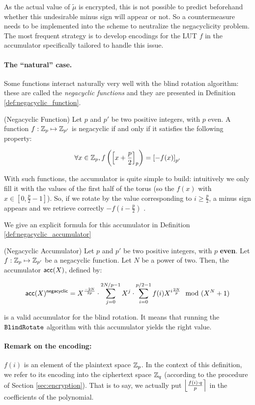 As the actual value of $\tilde{\mu}$ is encrypted, this is not possible to predict beforehand whether this undesirable minus sign will appear or not. So a countermeasure needs to be implemented into the scheme to neutralize the negacyclicity problem. The most frequent strategy is to develop encodings for the LUT $f$ in the accumulator specifically tailored to handle this issue.


\paragraph{The ``natural'' case.}

Some functions interact naturally very well with the blind rotation algorithm: these are called the \textit{negacyclic functions} and they are presented in Definition \ref{def:negacyclic_function}.


\begin{definition} (Negacyclic Function)
	Let $p$ and $p'$ be two positive integers, with $p$ even. A function $f : \mathbb{Z}_p \mapsto \mathbb{Z}_{p'}$ is negacyclic if and only if it satisfies the following property:
	
	\[
		\forall x \in \mathbb{Z}_p, f\left (\left [ x + \frac p 2 \right ]_{p} \right ) = \left [ -f(x) \right ]_{p'}
	\]
	
	\label{def:negacyclic_function}
\end{definition}


With such functions, the accumulator is quite simple to build: intuitively we only fill it with the values of the first half of the torus (so the $f(x)$ with $x \in \left [0, \frac p 2 - 1 \right ]$). So, if we rotate by the value corresponding to $i \ge \frac p 2$, a minus sign appears and we retrieve correctly $-f\left(i - \frac p 2 \right)$ .

We give an explicit formula for this accumulator in Definition \ref{def:negacyclic_accumulator}

\begin{definition} (Negacyclic Accumulator)
		\label{def:negacyclic_accumulator}
		Let $p$ and $p'$ be two positive integers, with $p$ \textbf{even}. Let $f:\mathbb{Z}_p \mapsto \mathbb{Z}_{p'}$ be a negacyclic function. Let $N$ be a power of two. Then, the accumulator $\textsf{acc}(X)$, defined by:
	
	\[
		\textsf{acc}(X)^{\textsf{negacyclic}} = X^{\frac{-2N}{2p}} \cdot \sum_{j=0}^{2N / p - 1} X^j \cdot \sum_{i=0}^{p/2 - 1} f(i) X^{i \frac{2N}{p}} \mod (X^N + 1)
	\]
	
\noindent is a valid accumulator for the blind rotation. It means that running the $\texttt{BlindRotate}$ algorithm with this accumulator yields the right value.
	
	\paragraph{Remark on the encoding:}
	$f(i)$ is an element of the plaintext space $\mathbb{Z}_p$. In the context of this definition, we refer to its encoding into the ciphertext space $\mathbb{Z}_q$ (according to the procedure of Section \ref{sec:encryption}). That is to say, we actually put $\left \lfloor \frac{f(i) \cdot q}{p} \right \rceil$ in the coefficients of the polynomial.
\end{definition}



